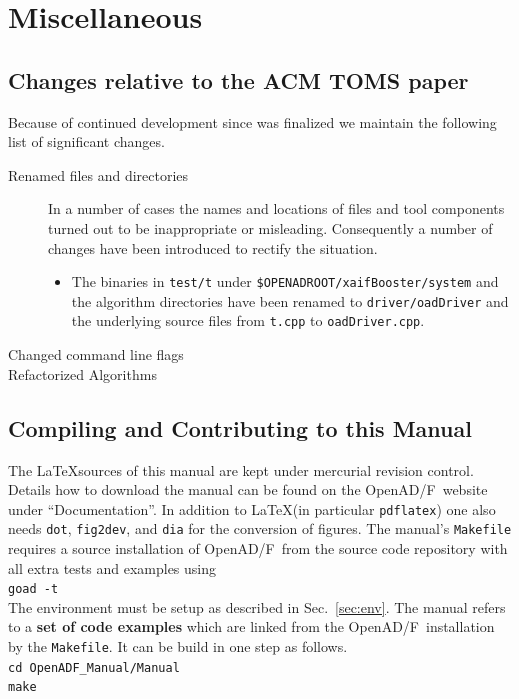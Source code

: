 \documentclass{book}
\newcommand{\OpenADF}{OpenAD/F}
\newcommand{\refsec}[1]{{Sec.~\ref{#1}}}
\begin{document}
\chapter{Miscellaneous}\label{sec:misc}
\section{Changes relative to the ACM TOMS paper}\label{sec:changesSinceTOMS}
Because of continued development since \cite{Utke2008OAM} was finalized 
we maintain the following list of significant changes.
\begin{description} 
\item[Renamed files and directories] In a number of cases the names and locations of files and 
tool components turned out to be inappropriate or misleading. Consequently a number of changes 
have been introduced to rectify the situation.  
{
\begin{itemize}
\item The binaries in \lstinline{test/t} under \lstinline{$OPENADROOT/xaifBooster/system} %
and the algorithm directories have been renamed to \lstinline{driver/oadDriver} and the 
underlying source files from \lstinline{t.cpp} to \lstinline{oadDriver.cpp}.
\end{itemize}
}
\item[Changed command line flags]
\item[Refactorized Algorithms]
\end{description}
\section{Compiling and Contributing to this Manual}\label{sec:compilingManual}
The \LaTeX  sources of this manual are kept under 
mercurial revision control. Details how to download 
the manual can be found on the \OpenADF\ website under ``Documentation''.  
In addition to \LaTeX  (in particular \lstinline{pdflatex}) 
one also needs \lstinline{dot}, \lstinline{fig2dev}, and 
\lstinline{dia} for the conversion of figures. 
The manual's \lstinline{Makefile} requires a source installation of \OpenADF\
from the source code repository with all extra tests and examples using \\[1ex]
\hspace*{.3cm}\lstinline{goad -t}\\[1ex]
The environment must be setup as described in \refsec{sec:env}.
The manual refers to a {\bf set of code examples} which are 
linked from the \OpenADF\ installation by the \lstinline{Makefile}.
It can be build in one step as follows.\\[1ex]
\hspace*{.3cm}\lstinline{cd OpenADF_Manual/Manual}\\
\hspace*{.3cm}\lstinline{make}\\[1ex]
   
\end{document}
